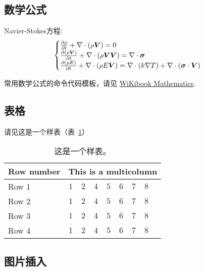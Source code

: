 \subsection{数学公式}

Navier-Stokes方程:
\begin{equation} \label{eq:ns}
    \begin{cases}
        \frac{\partial \rho}{\partial t} + \nabla\cdot(\rho\boldsymbol{V}) = 0 \\
        \frac{\partial (\rho\boldsymbol{V})}{\partial t} + \nabla\cdot(\rho\boldsymbol{V}\boldsymbol{V}) = \nabla\cdot\boldsymbol{\mathsf{\sigma}}\\
        \frac{\partial (\rho E)}{\partial t} + \nabla\cdot(\rho E\boldsymbol{V}) = \nabla\cdot(k\nabla T) + \nabla\cdot(\boldsymbol{\mathsf{\sigma}}\cdot\boldsymbol{V})
    \end{cases}
\end{equation}

常用数学公式的命令代码模板，请见 \href{https://en.wikibooks.org/wiki/LaTeX/Mathematics}{WiKibook Mathematics}.

\subsection{表格}

请见这是一个样表（表~\ref{tab:sample}）
\begin{table}[!htbp]
    \centering
    \footnotesize%
    \setlength{\tabcolsep}{4pt}%
    \renewcommand{\arraystretch}{1.2}%
    \begin{tabular}{lcccccccc}
        \hline\hline
        Row number & \multicolumn{8}{c}{This is a multicolumn} \\
        \hline
        Row 1 & $1$ & $2$ & $4$ & $5$ & $6$ & $7$ & $8$\\
        \hline
        Row 2 & $1$ & $2$ & $4$ & $5$ & $6$ & $7$ & $8$\\
        \hline
        Row 3 & $1$ & $2$ & $4$ & $5$ & $6$ & $7$ & $8$\\
        \hline
        Row 4 & $1$ & $2$ & $4$ & $5$ & $6$ & $7$ & $8$\\
        \hline\hline
    \end{tabular}
    \caption{这是一个样表。}
    \label{tab:sample}
\end{table}

\subsection{图片插入}

